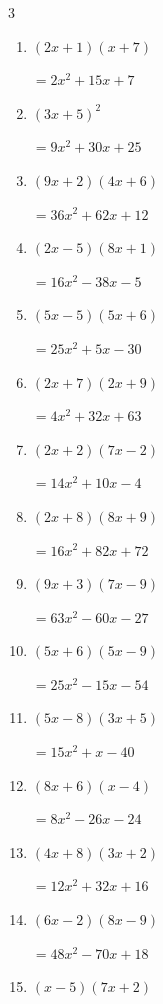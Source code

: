 \begin{multicols}{3}
\begin{enumerate}
        $=3x^{2}+28x+49$

\columnbreak %

  \item $(2x+1)(x+7)$

        $=2x^{2}+15x+7$

  \item $(3x+5)^{2}$

        $=9x^{2}+30x+25$

  \item $(9x+2)(4x+6)$

        $=36x^{2}+62x+12$

  \item $(2x-5)(8x+1)$

        $=16x^{2}-38x-5$

  \item $(5x-5)(5x+6)$

        $=25x^{2}+5x-30$

  \item $(2x+7)(2x+9)$

        $=4x^{2}+32x+63$

  \item $(2x+2)(7x-2)$

        $=14x^{2}+10x-4$

  \item $(2x+8)(8x+9)$

        $=16x^{2}+82x+72$

  \item $(9x+3)(7x-9)$

        $=63x^{2}-60x-27$

  \item $(5x+6)(5x-9)$

        $=25x^{2}-15x-54$

  \item $(5x-8)(3x+5)$

        $=15x^{2}+x-40$

  \item $(8x+6)(x-4)$

        $=8x^{2}-26x-24$

  \item $(4x+8)(3x+2)$

        $=12x^{2}+32x+16$

  \item $(6x-2)(8x-9)$

        $=48x^{2}-70x+18$

  \item $(x-5)(7x+2)$


\end{enumerate}
\end{multicols}
